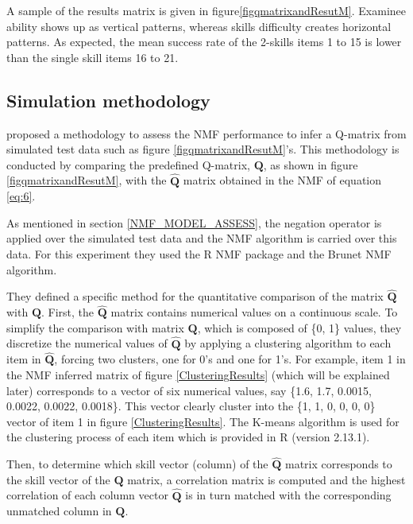 A sample of the results matrix is given in figure\ref{figqmatrixandResutM}. Examinee ability shows up as vertical patterns, whereas skills difficulty creates horizontal patterns. As expected, the mean success rate of the 2-skills items 1 to 15 is lower than the single skill items 16 to 21.



\subsection{Simulation methodology}


\citet{desmarais2012mapping} proposed a methodology to assess the NMF performance to infer a Q-matrix from simulated test data such as figure \ref{figqmatrixandResutM}'s. This methodology is conducted by comparing the predefined Q-matrix, $\mathbf{Q}$, as shown in figure \ref{figqmatrixandResutM}, with the $\hat{\mathbf{Q}}$ matrix obtained in the NMF of equation \ref{eq:6}.

As mentioned in section \ref{NMF_MODEL_ASSESS}, the negation operator is applied over the simulated test data and the NMF algorithm is carried over this data. For this experiment they used the R NMF package \citep{Gaujoux2010} and the Brunet NMF algorithm.

They defined a specific method for the quantitative comparison of the matrix $\hat{\mathbf{Q}}$ with $\mathbf{Q}$. First, the $\hat{\mathbf{Q}}$ matrix contains numerical values on a continuous scale. To simplify the comparison with matrix $\mathbf{Q}$, which is composed of \{0, 1\} values, they discretize the numerical values of $\hat{\mathbf{Q}}$ by applying a clustering algorithm to each item in $\hat{\mathbf{Q}}$, forcing two clusters, one for 0\textquoteright{}s and one for 1\textquoteright{}s. For example, item 1 in the NMF inferred matrix of figure \ref{ClusteringResults}  (which will be explained later) corresponds to a vector of six numerical values, say \{1.6, 1.7, 0.0015, 0.0022, 0.0022, 0.0018\}. This vector clearly cluster into the \{1, 1, 0, 0, 0, 0\} vector of item 1 in figure \ref{ClusteringResults}. The K-means algorithm is used for the clustering process of each item which is provided in R (version 2.13.1).

Then, to determine which skill vector (column) of the $\hat{\mathbf{Q}}$ matrix corresponds to the skill vector of the $\mathbf{Q}$ matrix, a correlation matrix is computed and the highest correlation of each column vector $\hat{\mathbf{Q}}$ is in turn matched with the corresponding unmatched column in $\mathbf{Q}$.

